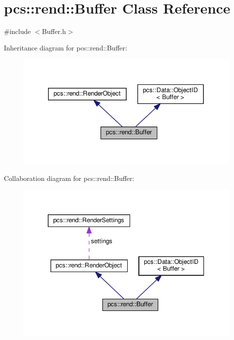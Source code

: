 \hypertarget{classpcs_1_1rend_1_1Buffer}{}\section{pcs\+:\+:rend\+:\+:Buffer Class Reference}
\label{classpcs_1_1rend_1_1Buffer}


{\ttfamily \#include $<$Buffer.\+h$>$}



Inheritance diagram for pcs\+:\+:rend\+:\+:Buffer\+:\nopagebreak
\begin{figure}[H]
\begin{center}
\leavevmode
\includegraphics[width=326pt]{classpcs_1_1rend_1_1Buffer__inherit__graph}
\end{center}
\end{figure}


Collaboration diagram for pcs\+:\+:rend\+:\+:Buffer\+:\nopagebreak
\begin{figure}[H]
\begin{center}
\leavevmode
\includegraphics[width=330pt]{classpcs_1_1rend_1_1Buffer__coll__graph}
\end{center}
\end{figure}
